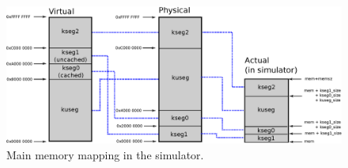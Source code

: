 \begin{figure}[h]
	\includegraphics[width=\textwidth]{mmu/memory_mapping.eps}
	\caption{Main memory mapping in the simulator.}
	\label{fig:address_space_mapping}
\end{figure}


